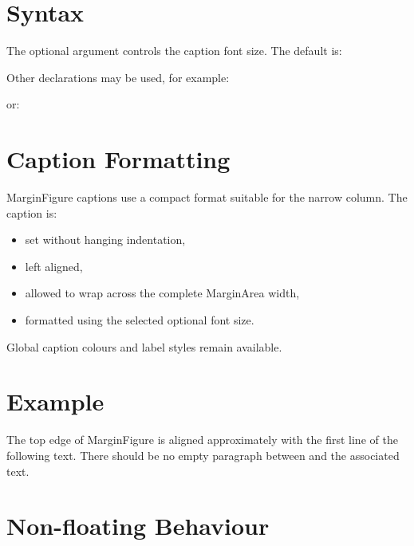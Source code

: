 \documentclass[
11pt,
a4paper,
oneside
]{scrbook}
\begin{document}
\section{Syntax}





The optional argument controls the caption font size.
The default is:




Other declarations may be used, for example:




	or:




	
\section{Caption Formatting}
 
MarginFigure captions use a compact format suitable for the narrow column.
The caption is:
\begin{itemize}
	\item set without hanging indentation,
	\item left aligned,
	\item allowed to wrap across the complete MarginArea width,
	\item formatted using the selected optional font size.
\end{itemize}
Global caption colours and label styles remain available.
 
\section{Example}

\begin{MarginFigure}[\footnotesize]
	\caption{Tixi handles MarginArea, FullArea, and TextArea
		in a playful manner.}
\end{MarginFigure}
The top edge of MarginFigure  
is aligned approximately with the first line of the following text.
There should be no empty paragraph between  and the
associated text.





	
\section{Non-floating Behaviour}
	
\end{document}
